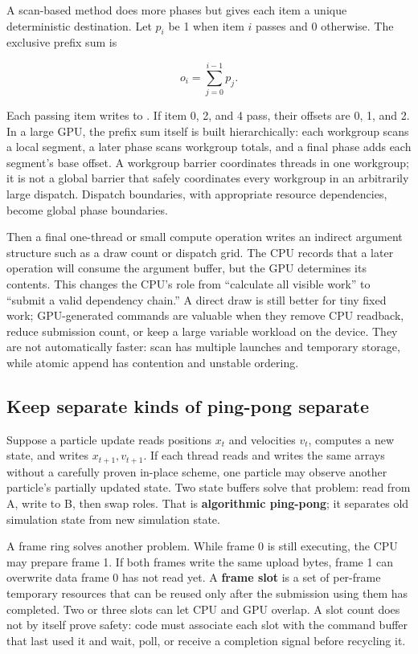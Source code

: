 A scan-based method does more phases but gives each item a unique deterministic destination. Let \(p_i\) be 1 when item \(i\) passes and 0 otherwise. The exclusive prefix sum is

\[
o_i=\sum_{j=0}^{i-1}p_j.
\]

Each passing item writes to . If item 0, 2, and 4 pass, their offsets are 0, 1, and 2. In a large GPU, the prefix sum itself is built hierarchically: each workgroup scans a local segment, a later phase scans workgroup totals, and a final phase adds each segment's base offset. A workgroup barrier coordinates threads in one workgroup; it is not a global barrier that safely coordinates every workgroup in an arbitrarily large dispatch. Dispatch boundaries, with appropriate resource dependencies, become global phase boundaries.

Then a final one-thread or small compute operation writes an indirect argument structure such as a draw count or dispatch grid. The CPU records that a later operation will consume the argument buffer, but the GPU determines its contents. This changes the CPU's role from ``calculate all visible work'' to ``submit a valid dependency chain.'' A direct draw is still better for tiny fixed work; GPU-generated commands are valuable when they remove CPU readback, reduce submission count, or keep a large variable workload on the device. They are not automatically faster: scan has multiple launches and temporary storage, while atomic append has contention and unstable ordering.

\subsection{Keep separate kinds of ping-pong separate}\label{05-engine-i-ch019-keep-separate-kinds-of-ping-pong-separate}

\hypertarget{05-engine-i-ch019-keep-separate-kinds-of-ping-pong-separate}{}

Suppose a particle update reads positions \(x_t\) and velocities \(v_t\), computes a new state, and writes \(x_{t+1},v_{t+1}\). If each thread reads and writes the same arrays without a carefully proven in-place scheme, one particle may observe another particle's partially updated state. Two state buffers solve that problem: read from A, write to B, then swap roles. That is \textbf{algorithmic ping-pong}; it separates old simulation state from new simulation state.

A frame ring solves another problem. While frame 0 is still executing, the CPU may prepare frame 1. If both frames write the same upload bytes, frame 1 can overwrite data frame 0 has not read yet. A \textbf{frame slot} is a set of per-frame temporary resources that can be reused only after the submission using them has completed. Two or three slots can let CPU and GPU overlap. A slot count does not by itself prove safety: code must associate each slot with the command buffer that last used it and wait, poll, or receive a completion signal before recycling it.

